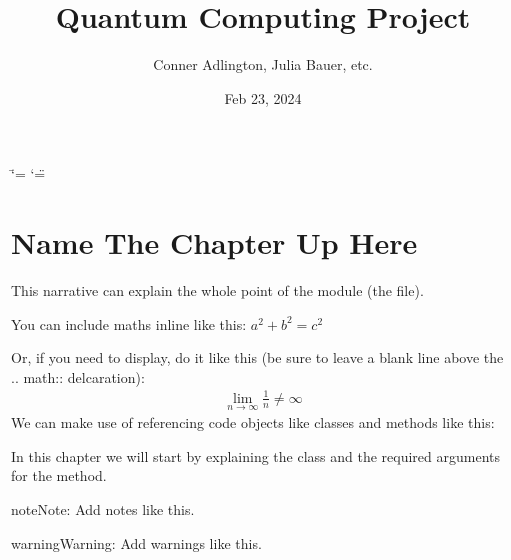 \documentclass[letterpaper,10pt,english]{sphinxmanual}
\title{Quantum Computing Project}
\date{Feb 23, 2024}
\author{
Conner Adlington, Julia Bauer, etc.\@{} 
}
\begin{document}
\ifdefined\shorthandoff
  \ifnum\catcode`\=\string=\active\shorthandoff{=}\fi
  \ifnum\catcode`\"=\active{}\fi
\fi

\pagestyle{empty}
\sphinxmaketitle
\pagestyle{plain}
\sphinxtableofcontents
\pagestyle{normal}
\label{\detokenize{index::doc}}


\chapter{Name The Chapter Up Here}
\label{\detokenize{index:name-the-chapter-up-here}}\label{\detokenize{index:module-example}}
\sphinxAtStartPar
This narrative can explain the whole point of the module (the file).

\sphinxAtStartPar
You can include maths inline like this: \(a^2 + b^2 = c^2\)

\sphinxAtStartPar
Or, if you need to display, do it like this (be sure to leave a blank line
above the .. math:: delcaration):
\begin{equation*}
\begin{split}\lim_{n\to\infty} \frac{1}{n} \neq \infty\end{split}
\end{equation*}
\sphinxAtStartPar
We can make use of referencing code objects like classes and methods
like this:

\sphinxAtStartPar
In this chapter we will start by explaining the {\hyperref[\detokenize{index:example.Example}]{}} class
and the required arguments for the  method.

\begin{sphinxadmonition}{note}{Note:}
\sphinxAtStartPar
Add notes like this.
\end{sphinxadmonition}

\begin{sphinxadmonition}{warning}{Warning:}
\sphinxAtStartPar
Add warnings like this.
\end{sphinxadmonition}
\end{document}
